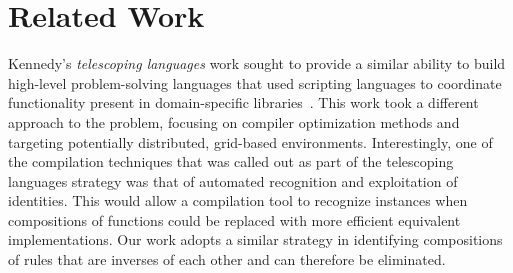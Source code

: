 
\section{Related Work}

% 
% 
% 

Kennedy's \emph{telescoping languages} work sought to provide a similar ability
to build high-level problem-solving languages that used scripting languages to
coordinate functionality present in domain-specific
libraries~\cite{kennedy00telescoping}. This work took a different approach to
the problem, focusing on compiler optimization methods and targeting potentially
distributed, grid-based environments. Interestingly, one of the compilation
techniques that was called out as part of the telescoping languages strategy was
that of automated recognition and exploitation of identities. This would allow a
compilation tool to recognize instances when compositions of functions could be
replaced with more efficient equivalent implementations. Our work adopts a
similar strategy in identifying compositions of rules that are inverses of each
other and can therefore be eliminated.

